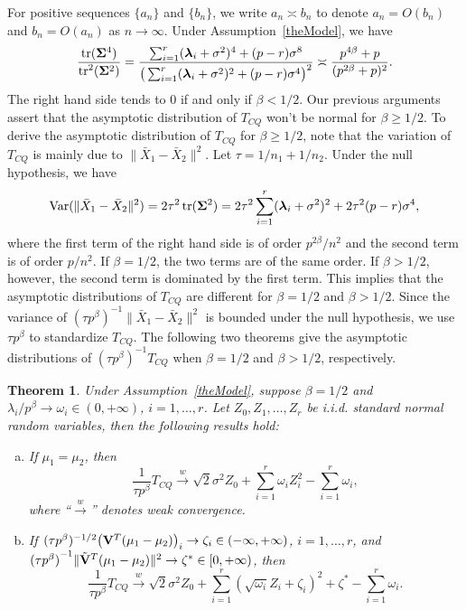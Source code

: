 \documentclass[3p]{elsarticle}
\DeclareMathOperator{\mytr}{tr}
\DeclareMathOperator{\myVar}{Var}
\newcommand{\bfsym}[1]{\ensuremath{\boldsymbol{#1}}}
\def\blambda {\bfsym {\lambda}}        \def\bLambda {\bfsym {\Lambda}}
\theoremstyle{plain}
\newtheorem{theorem}{\quad\quad Theorem}
\theoremstyle{definition}
\theoremstyle{remark}
\begin{document}
For positive sequences $\{a_n\}$ and $\{b_n\}$, we write $a_n\asymp b_n$ to denote $a_n=O(b_n)$ and $b_n=O(a_n)$ as $n\to \infty$.
Under Assumption~\ref{theModel}, we have
$$
\frac{\mytr(\bSigma^4)}{\mytr^2(\bSigma^2)}=
\frac{\sum_{i=1}^r (\blambda_i+\sigma^2)^4+(p-r)\sigma^8}{\big(\sum_{i=1}^r (\blambda_i+\sigma^2)^2+(p-r)\sigma^4\big)^2}\asymp \frac{p^{4\beta}+p}{(p^{2\beta}+p)^2}.
$$
The right hand side tends to $0$ if and only if $\beta<1/2$.
Our previous arguments assert that the asymptotic distribution of $T_{CQ}$ won't be normal for $\beta\geq 1/2$.
To derive the asymptotic distribution of $T_{CQ}$ for $\beta\geq 1/2$,
note that the variation of $T_{CQ}$ is mainly due to $\|\bar{X}_1-\bar{X}_2\|^2$.
Let $\tau=1/n_1+1/n_2$.
Under the null hypothesis, we have
$$
\myVar(\|\bar{X}_1-\bar{X}_2\|^2)=
2\tau^2 \mytr (\bSigma^2)=2\tau^2 \sum_{i=1}^r (\blambda_i+
\sigma^2)^2
+ 2\tau^2 (p-r)\sigma^4,
$$
where the first term of the right hand side is of order $p^{2\beta}/n^2$ and the second term is of order $p/n^2$.
If $\beta=1/2$, the two terms are of the same order. 
If $\beta>1/2$, however, the second term is dominated by the first term.
This implies that the asymptotic distributions of $T_{CQ}$ are different for $\beta=1/2$ and $\beta>1/2$.
Since the variance of $(\tau p^{\beta})^{-1}\|\bar{X}_1-\bar{X}_2\|^2$ is bounded under the null hypothesis, we use $\tau p^{\beta}$ to standardize $T_{CQ}$.
The following two theorems give the asymptotic distributions of $(\tau p^{\beta})^{-1}T_{CQ}$ when $\beta= 1/2$ and $\beta>1/2$, respectively.
\begin{theorem}\label{Chenstheory1}
 Under Assumption~\ref{theModel},
    suppose $\beta=1/2$ and $\lambda_i/p^\beta \to \omega_i\in(0,+\infty)$, $i=1,\ldots,r$.
    Let $Z_{0},Z_1,\ldots,Z_{r}$ be i.i.d. standard normal random variables,
     then the following results hold:
     \begin{enumerate}[(a)]
         \item
             If $\mu_1=\mu_2$, then
    $$
        \frac{1}{\tau p^{\beta}} T_{CQ}
        \xrightarrow{w}
\sqrt{2}\sigma^2 Z_0
+
        \sum_{i=1}^r \omega_i Z_i^2
            -
        \sum_{i=1}^r \omega_i,
    $$
             where ``$\xrightarrow{w}$'' denotes weak convergence.
         \item
             If $(\tau p^{\beta})^{-1/2}\big(\mathbf{V}^T (\mu_1-\mu_2)\big)_i\to \zeta_i\in(-\infty,+\infty)$, $i=1,\ldots,r$,
             and
    ${(\tau p^\beta)}^{-1}\|\tilde{\mathbf{V}}^T (\mu_1-\mu_2)\|^2\to \zeta^*\in [0,+\infty)$, then
    $$
        \frac{1}{\tau p^{\beta}} T_{CQ}
        \xrightarrow{w}
\sqrt{2}\sigma^2 Z_0+
        \sum_{i=1}^r (\sqrt{\omega_i} Z_i+\zeta_i)^2+
\zeta^*
        -
        \sum_{i=1}^r \omega_i.
    $$
     \end{enumerate}
\end{theorem}
\end{document}
